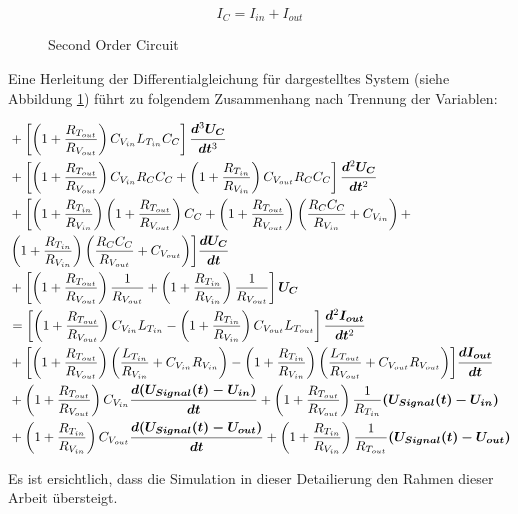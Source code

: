 \documentclass[fontsize=12pt, a4paper]{scrartcl}
\begin{document}
\begin{equation}
	I_{C} = I_{in} + I_{out}
\end{equation}

\begin{figure}[H]
	
	\caption{Second Order Circuit}
	\label{outlookcircuit}
\end{figure}

Eine Herleitung der Differentialgleichung für dargestelltes System (siehe Abbildung \ref{outlookcircuit}) führt zu folgendem Zusammenhang nach Trennung der Variablen:


\begin{equation}
	\begin{split}
		&+ \left[\left(1+\frac{R_{T_{out}}}{R_{V_{out}}}\right)C_{V_{in}}L_{T_{in}}C_{C}\right]\bm{\frac{d\textsuperscript{3}U_{C}}{dt\textsuperscript{3}}} \\
		&+ \left[\left(1+\frac{R_{T_{out}}}{R_{V_{out}}}\right)C_{V_{in}}R_{C}C_{C} + \left(1+\frac{R_{T_{in}}}{R_{V_{in}}}\right)C_{V_{out}}R_{C}C_{C}\right]\bm{\frac{d\textsuperscript{2}U_{C}}{dt\textsuperscript{2}}} \\
		&+ \biggl[\left(1+\frac{R_{T_{in}}}{R_{V_{in}}}\right)\left(1+\frac{R_{T_{out}}}{R_{V_{out}}}\right)C_{C} + \left(1+\frac{R_{T_{out}}}{R_{V_{out}}}\right)\left(\frac{R_{C}C_{C}}{R_{V_{in}}}+C_{V_{in}}\right) + \\
		& \left(1+\frac{R_{T_{in}}}{R_{V_{in}}}\right)\left(\frac{R_{C}C_{C}}{R_{V_{out}}}+C_{V_{out}}\right)\biggr] \bm{\frac{dU_{C}}{dt}}  \\
		&+ \left[\left(1+\frac{R_{T_{out}}}{R_{V_{out}}}\right)\frac{1}{R_{V_{out}}} + \left(1+\frac{R_{T_{in}}}{R_{V_{in}}}\right)\frac{1}{R_{V_{out}}}\right]\bm{U_{C}} \\
		&= \left[\left(1+\frac{R_{T_{out}}}{R_{V_{out}}}\right)C_{V_{in}}L_{T_{in}} - \left(1+\frac{R_{T_{in}}}{R_{V_{in}}}\right)C_{V_{out}}L_{T_{out}}\right]\bm{\frac{d\textsuperscript{2}I_{out}}{dt\textsuperscript{2}}} \\
		&+ \biggl[\left(1+\frac{R_{T_{out}}}{R_{V_{out}}}\right)\left(\frac{L_{T_{in}}}{R_{V_{in}}}+C_{V_{in}}R_{V_{in}}\right) - \left(1+\frac{R_{T_{in}}}{R_{V_{in}}}\right)\left(\frac{L_{T_{out}}}{R_{V_{out}}}+C_{V_{out}}R_{V_{out}}\right)\biggr]\bm{\frac{dI_{out}}{dt}} \\
		&+ \left(1+\frac{R_{T_{out}}}{R_{V_{out}}}\right)C_{V_{in}}\bm{\frac{d(U_{Signal}(t) - U_{in})}{dt}} + \left(1+\frac{R_{T_{out}}}{R_{V_{out}}}\right)\frac{1}{R_{T_{in}}}\bm{(U_{Signal}(t) - U_{in})} \\
		&+ \left(1+\frac{R_{T_{in}}}{R_{V_{in}}}\right)C_{V_{out}}\bm{\frac{d(U_{Signal}(t) - U_{out})}{dt}} + \left(1+\frac{R_{T_{in}}}{R_{V_{in}}}\right)\frac{1}{R_{T_{out}}}\bm{(U_{Signal}(t) - U_{out})}
	\end{split}
\end{equation}


Es ist ersichtlich, dass die Simulation in dieser Detailierung den Rahmen dieser Arbeit übersteigt.


\printbibliography
\end{document}
